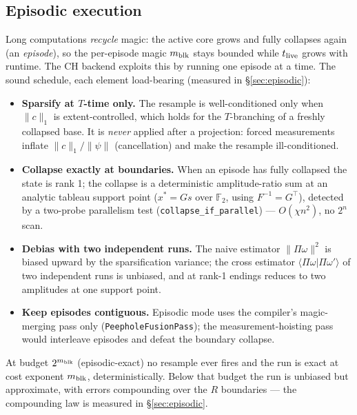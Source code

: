 \documentclass[11pt]{article}
\begin{document}
\subsection{Episodic execution}\label{sec:episodic-theory}
Long computations \emph{recycle} magic: the active core grows and fully
collapses again (an \emph{episode}), so the per-episode magic $m_{\rm blk}$
stays bounded while $t_{\rm live}$ grows with runtime. The CH backend exploits
this by running one episode at a time. The sound schedule, each element
load-bearing (measured in \S\ref{sec:episodic}):
\begin{itemize}
\item \textbf{Sparsify at $T$-time only.} The resample is well-conditioned
only when $\lVert c\rVert_1$ is extent-controlled, which holds for the
$T$-branching of a freshly collapsed base. It is \emph{never} applied after a
projection: forced measurements inflate
$\lVert c\rVert_1/\lVert\psi\rVert$ (cancellation) and make the resample
ill-conditioned.
\item \textbf{Collapse exactly at boundaries.} When an episode has fully
collapsed the state is rank 1; the collapse is a deterministic
amplitude-ratio sum at an analytic tableau support point ($x^*=Gs$ over
$\mathbb{F}_2$, using $F^{-1}=G^\top$), detected by a two-probe parallelism
test (\texttt{collapse\_if\_parallel}) --- $O(\chi n^2)$, no $2^n$ scan.
\item \textbf{Debias with two independent runs.} The naive estimator
$\lVert\Pi\omega\rVert^2$ is biased upward by the sparsification variance;
the cross estimator $\langle\Pi\omega|\Pi\omega'\rangle$ of two independent
runs is unbiased, and at rank-1 endings reduces to two amplitudes at one
support point.
\item \textbf{Keep episodes contiguous.} Episodic mode uses the compiler's
magic-merging pass only (\texttt{PeepholeFusionPass}); the
measurement-hoisting pass would interleave episodes and defeat the boundary
collapse.
\end{itemize}
At budget $2^{m_{\rm blk}}$ (episodic-exact) no resample ever fires and the
run is exact at cost exponent $m_{\rm blk}$, deterministically. Below that
budget the run is unbiased but approximate, with errors compounding over the
$R$ boundaries --- the compounding law is measured in \S\ref{sec:episodic}.
\end{document}
